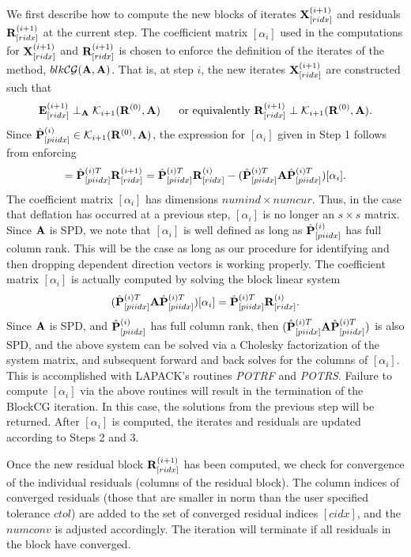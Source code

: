 \documentclass{article}
\newcommand{\bA}{{\bf A}}
\newcommand{\bE}{{\bf E}}
\newcommand{\bP}{{\bf P}}
\newcommand{\bR}{{\bf R}}
\newcommand{\bX}{{\bf X}}
\newcommand{\dm}{\begin{displaymath}}
\newcommand{\edm}{\end{displaymath}}
\begin{document}
We first describe how to compute the new blocks of iterates
$\bX^{(i+1)}_{[ridx]}$ and residuals $\bR^{(i+1)}_{[ridx]}$ at the
current step. The coefficient matrix $[\alpha_i]$ used in the
computations for $\bX^{(i+1)}_{[ridx]}$ and $\bR^{(i+1)}_{[ridx]}$
is chosen to enforce the definition of the iterates of the method,
$blk{\cal CG}(\bA, \bA)$. That is, at step $i$, the new iterates
$\bX^{(i+1)}_{[ridx]}$ are constructed such that
 \dm
  \bE_{[ridx]}^{(i+1)}  \perp_{\bA}  {\cal K}_{i+1} (\bR^{(0)}, \bA) \\
  ~~~~~{\rm or~equivalently}~~ \\
  \bR_{[ridx]}^{(i+1)}  \perp  {\cal K}_{i+1} (\bR^{(0)}, \bA).
  \edm
Since ${\hat \bP}^{(i)}_{[piidx]} \in {\cal K}_{i+1}(\bR^{(0)},
\bA)$, the expression for $[\alpha_i]$ given in Step 1 follows
from enforcing
 \dm
 [ {\bf 0} ] = {\hat \bP}^{(i)T}_{[piidx]} \bR^{(i+1)}_{[ridx]} =
   {\hat \bP}^{(i)T}_{[piidx]} \bR^{(i)}_{[ridx]}
 - ( {\hat \bP}^{(i)T}_{[piidx]} \bA {\hat \bP}^{(i)T}_{[piidx]})
 [ \alpha_i ].
 \edm
The coefficient matrix $[\alpha_i]$ has dimensions $numind \times
numcur$. Thus, in the case that deflation has occurred at a
previous step, $[\alpha_i]$ is no longer an $s \times s$ matrix.
Since $\bA$ is SPD, we note that $[\alpha_i]$ is well defined as
long as ${\hat \bP}^{(i)}_{[piidx]}$ has full column rank. This
will be the case as long as our procedure for identifying and then
dropping dependent direction vectors is working properly. The
coefficient matrix $[\alpha_i]$ is actually computed by solving
the block linear system
 \dm
 ( {\hat \bP}^{(i)T}_{[piidx]} \bA {\hat \bP}^{(i)T}_{[piidx]})
 [ \alpha_i ] = {\hat \bP}^{(i)T}_{[piidx]} \bR^{(i)}_{[ridx]}.
 \edm
Since $\bA$ is SPD, and ${\hat \bP}^{(i)}_{[piidx]}$ has full
column rank, then $( {\hat \bP}^{(i)T}_{[piidx]} \bA {\hat
\bP}^{(i)T}_{[piidx]})$ is also SPD, and the above system can be
solved via a Cholesky factorization of the system matrix, and
subsequent forward and back solves for the columns of
$[\alpha_i]$. This is accomplished with LAPACK's routines {\it
POTRF} and {\it POTRS}. Failure to compute $[\alpha_i]$ via the
above routines will result in the termination of the BlockCG
iteration. In this case, the solutions from the previous step will
be returned. After $[\alpha_i]$ is computed, the iterates and
residuals are updated according to Steps 2 and 3.

Once the new residual block $\bR^{(i+1)}_{[ridx]}$ has been
computed, we check for convergence of the individual residuals
(columns of the residual block). The column indices of converged
residuals (those that are smaller in norm than the user specified
tolerance $ctol$) are added to the set of converged residual
indices $[cidx]$, and the $numconv$ is adjusted accordingly. The
iteration will terminate if all residuals in the block have
converged.
\end{document}
